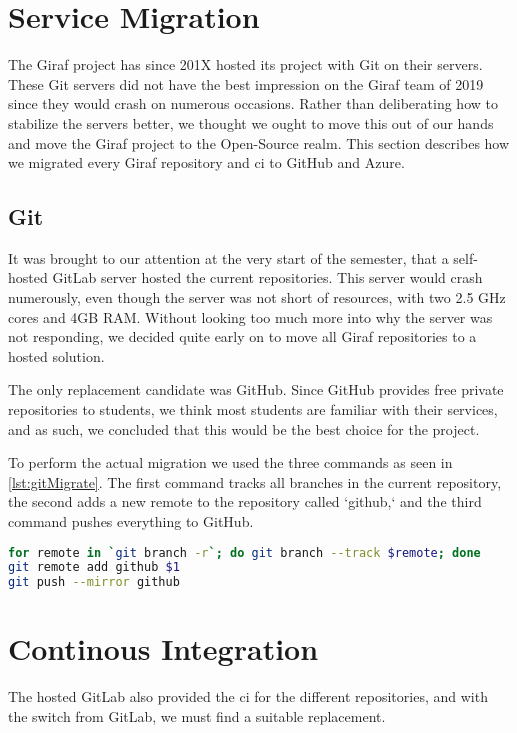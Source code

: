 \section{Service Migration}

The Giraf project has since 201X hosted its project with Git on their servers. These Git servers did not have the best impression on the Giraf team of 2019 since they would crash on numerous occasions. Rather than deliberating how to stabilize the servers better, we thought we ought to move this out of our hands and move the Giraf project to the Open-Source realm. This section describes how we migrated every Giraf repository and \gls{ci} to GitHub and Azure.

\subsection{Git}

It was brought to our attention at the very start of the semester, that a self-hosted GitLab server hosted the current repositories. This server would crash numerously, even though the server was not short of resources, with two 2.5 GHz cores and 4GB RAM. Without looking too much more into why the server was not responding, we decided quite early on to move all Giraf repositories to a hosted solution. 

The only replacement candidate was GitHub. Since GitHub provides free private repositories to students, we think most students are familiar with their services, and as such, we concluded that this would be the best choice for the project.

To perform the actual migration we used the three commands as seen in \autoref{lst:gitMigrate}. The first command tracks all branches in the current repository, the second adds a new remote to the repository called `github,` and the third command pushes everything to GitHub.

\begin{lstlisting}[language=bash,label={lst:gitMigrate},caption={Git Migration code}]
for remote in `git branch -r`; do git branch --track $remote; done
git remote add github $1
git push --mirror github
\end{lstlisting}

\section{Continous Integration}

The hosted GitLab also provided the \gls{ci} for the different repositories, and with the switch from GitLab, we must find a suitable replacement.

